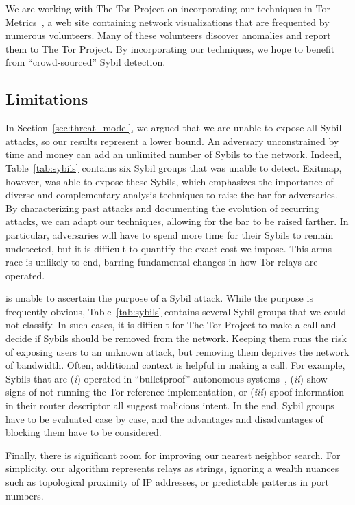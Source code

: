 We are working with The Tor Project on incorporating our techniques in Tor
Metrics~\cite{metrics}, a web site containing network visualizations that are
frequented by numerous volunteers.  Many of these volunteers discover anomalies
and report them to The Tor Project.  By incorporating our techniques, we hope
to benefit from ``crowd-sourced'' Sybil detection.

\subsection{Limitations}
\label{sec:limitations}
In Section~\ref{sec:threat_model}, we argued that we are unable to expose all
Sybil attacks, so our results represent a lower bound.  An adversary
unconstrained by time and money can add an unlimited number of Sybils to the
network.  Indeed, Table~\ref{tab:sybils} contains six Sybil groups that \sys
was unable to detect.  Exitmap, however, was able to expose these Sybils, which
emphasizes the importance of diverse and complementary analysis techniques to
raise the bar for adversaries.  By characterizing past attacks and documenting
the evolution of recurring attacks, we can adapt our techniques, allowing for
the bar to be raised farther.  In particular, adversaries will have to spend
more time for their Sybils to remain undetected, but it is difficult to
quantify the exact cost we impose.  This arms race is unlikely to end, barring
fundamental changes in how Tor relays are operated.  

\Sys is unable to ascertain the purpose of a Sybil attack.  While the purpose
is frequently obvious, Table~\ref{tab:sybils} contains several Sybil groups
that we could not classify.  In such cases, it is difficult for The Tor Project
to make a call and decide if Sybils should be removed from the network.
Keeping them runs the risk of exposing users to an unknown attack, but removing
them deprives the network of bandwidth.  Often, additional context is helpful
in making a call.  For example, Sybils that are (\emph{i}) operated in
``bulletproof'' autonomous systems~\cite{Konte2015a}, (\emph{ii}) show signs of
not running the Tor reference implementation, or (\emph{iii}) spoof information
in their router descriptor all suggest malicious intent.  In the end, Sybil
groups have to be evaluated case by case, and the advantages and disadvantages
of blocking them have to be considered.

Finally, there is significant room for improving our nearest neighbor search.
For simplicity, our algorithm represents relays as strings, ignoring a wealth
nuances such as topological proximity of IP addresses, or predictable patterns
in port numbers.
